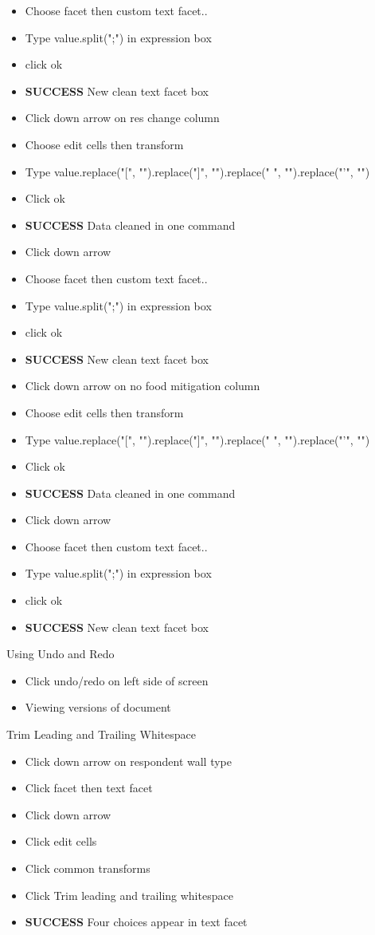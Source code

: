 \documentclass{article}
\begin{document}
\begin{itemize}
\item Choose facet then custom text facet..
\item Type value.split(";") in expression box
\item click ok
\item \textbf{SUCCESS} New clean text facet box
\item Click down arrow on res change column
\item Choose edit cells then transform
\item Type value.replace("[", "").replace("]", "").replace(" ", "").replace("'", "")
\item Click ok
\item \textbf{SUCCESS} Data cleaned in one command
\item Click down arrow
\item Choose facet then custom text facet..
\item Type value.split(";") in expression box
\item click ok
\item \textbf{SUCCESS} New clean text facet box
\item Click down arrow on no food mitigation column
\item Choose edit cells then transform
\item Type value.replace("[", "").replace("]", "").replace(" ", "").replace("'", "")
\item Click ok
\item \textbf{SUCCESS} Data cleaned in one command
\item Click down arrow
\item Choose facet then custom text facet..
\item Type value.split(";") in expression box
\item click ok
\item \textbf{SUCCESS} New clean text facet box
\end{itemize}
Using Undo and Redo
\begin{itemize}
\item Click undo/redo on left side of screen
\item Viewing versions of document
\end{itemize}
Trim Leading and Trailing Whitespace
\begin{itemize}
\item Click down arrow on respondent wall type
\item Click facet then text facet
\item Click down arrow
\item Click edit cells
\item Click common transforms
\item Click Trim leading and trailing whitespace
\item \textbf{SUCCESS} Four choices appear in text facet
\end{itemize}
\end{document}
